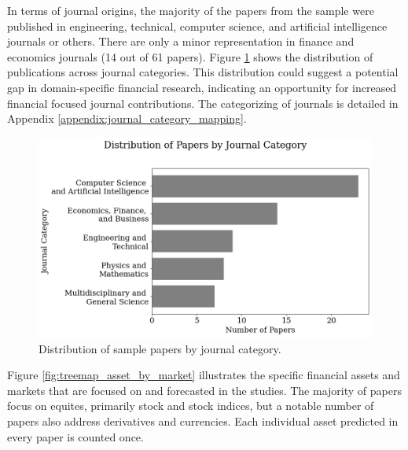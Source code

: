 In terms of journal origins, the majority of the papers from the sample were published in engineering, technical, computer science, and artificial intelligence journals or others. There are only a minor representation in finance and economics journals (14 out of 61 papers). Figure \ref{fig:num_papers_per_journal_category} shows the distribution of publications across journal categories. This distribution could suggest a potential gap in domain-specific financial research, indicating an opportunity for increased financial focused journal contributions. The categorizing of journals is detailed in Appendix \ref{appendix:journal_category_mapping}. 

\begin{figure}[H]
    \centering
    \includegraphics[width=1\linewidth]{Images/num_papers_per_journal_category.png}
    \caption{Distribution of sample papers by journal category.}
    \label{fig:num_papers_per_journal_category}
\end{figure}
Figure \ref{fig:treemap_asset_by_market} illustrates the specific financial assets and markets that are focused on and forecasted in the studies. The majority of papers focus on equites, primarily stock and stock indices, but a notable number of papers also address derivatives and currencies. Each individual asset predicted in every paper is counted once.   
